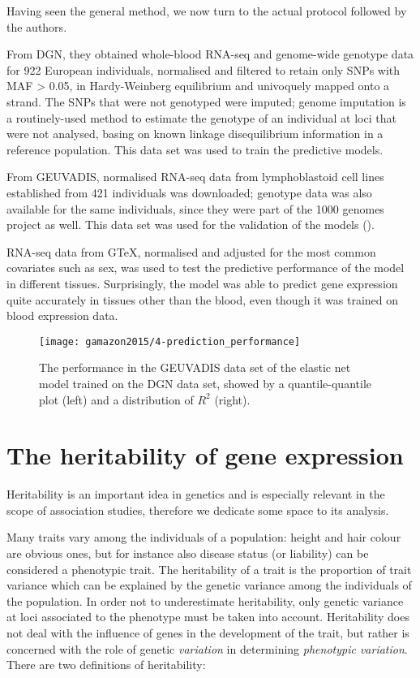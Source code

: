 \documentclass[../main.tex]{subfiles}
\begin{document}
Having seen the general method, we now turn to the actual protocol 
followed by the authors.

From DGN, they obtained whole-blood RNA-seq and genome-wide genotype 
data for 922 European individuals, normalised and filtered to retain 
only SNPs with MAF > 0.05, in Hardy-Weinberg equilibrium and univoquely 
mapped onto a strand. The SNPs that were not genotyped were imputed; 
genome imputation\cite{Marchini2010} is a routinely-used method to 
estimate the genotype of an individual at loci that were not analysed, 
basing on known linkage disequilibrium information in a reference 
population. This data set was used to train the predictive models.

From GEUVADIS, normalised RNA-seq data from lymphoblastoid cell lines 
established from 421 individuals was downloaded; genotype data was also 
available for the same individuals, since they were part of the 1000 
genomes project as well. This data set was used for the validation of 
the models ().

RNA-seq data from GTeX, normalised and adjusted for the most common 
covariates such as sex, was used to test the predictive performance of 
the model in different tissues. Surprisingly, the model was able to 
predict gene expression quite accurately in tissues other than the 
blood, even though it was trained on blood expression data.

\begin{figure}
	\texttt{[image: gamazon2015/4-prediction\_performance]}
	\caption{The performance in the GEUVADIS data set of the elastic net 
model trained on the DGN data set, showed by a quantile-quantile plot 
(left) and a distribution of $R^2$ (right).}
\end{figure}

\section{The heritability of gene expression}

Heritability is an important idea in genetics and is especially relevant 
in the scope of association studies, therefore we dedicate some space to 
its analysis.

Many traits vary among the individuals of a population: height and hair 
colour are obvious ones, but for instance also disease status (or 
liability) can be considered a phenotypic trait. The heritability of a 
trait is the proportion of trait variance which can be explained by the 
genetic variance among the individuals of the population. In order not 
to underestimate heritability, only genetic variance at loci associated 
to the phenotype must be taken into account. 
Heritability does not deal with the influence of genes in the 
development of the trait, but rather is concerned with the role of 
genetic \textit{variation} in determining \textit{phenotypic variation}. 
There are two definitions of heritability:
\end{document}
